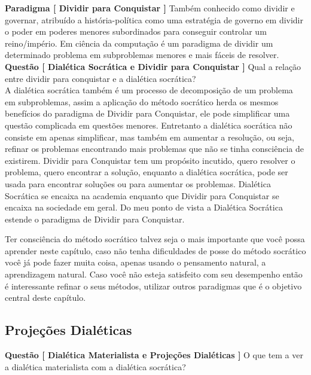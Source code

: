 \textbf{Paradigma [ Dividir para Conquistar ]} Também conhecido como dividir e governar, atribuído a história-política como uma estratégia de governo em dividir o poder em poderes menores subordinados para conseguir controlar um reino/império. Em ciência da computação é um paradigma de dividir um determinado problema em subproblemas menores e mais fáceis de resolver.\\

\textbf{Questão [ Dialética Socrática e Dividir para Conquistar ]} Qual a relação entre dividir para conquistar e a dialética socrática?\\

A dialética socrática também é um processo de decomposição de um problema em subproblemas, assim a aplicação do método socrático herda os mesmos benefícios do paradigma de Dividir para Conquistar, ele pode simplificar uma questão complicada em questões menores. Entretanto a dialética socrática não consiste em apenas simplificar, mas também em aumentar a resolução, ou seja, refinar os problemas encontrando mais problemas que não se tinha consciência de existirem. Dividir para Conquistar tem um propósito incutido, quero resolver o problema, quero encontrar a solução, enquanto a dialética socrática, pode ser usada para encontrar soluções ou para aumentar os problemas. Dialética Socrática se encaixa na academia enquanto que Dividir para Conquistar se encaixa na sociedade em geral. Do meu ponto de vista a Dialética Socrática estende o paradigma de Dividir para Conquistar.

Ter consciência do método socrático talvez seja o mais importante que você possa aprender neste capítulo, caso não tenha dificuldades de posse do método socrático você já pode fazer muita coisa, apenas usando o pensamento natural, a aprendizagem natural. Caso você não esteja satisfeito com seu desempenho então é interessante refinar o seus métodos, utilizar outros paradigmas que é o objetivo central deste capítulo.\\

\subsection{Projeções Dialéticas}

\hspace{\baselineskip}

% 
\textbf{Questão [ Dialética Materialista e Projeções Dialéticas ]} O que tem a ver a dialética materialista com a dialética socrática?\\

